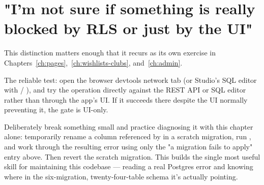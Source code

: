\section*{"I'm not sure if something is really blocked by RLS or just by the UI"}
This distinction matters enough that it recurs as its own exercise in Chapters~\ref{ch:pages},~\ref{ch:wishlists-clubs}, and~\ref{ch:admin}.

\begin{olkhowto}
The reliable test: open the browser devtools network tab (or Studio's SQL editor with  / ), and try the operation directly against the REST API or SQL editor rather than through the app's UI. If it succeeds there despite the UI normally preventing it, the gate is UI-only.
\end{olkhowto}

\begin{olktask}
Deliberately break something small and practice diagnosing it with this chapter alone: temporarily rename a column referenced by  in a scratch migration, run , and work through the resulting error using only the "a migration fails to apply" entry above. Then revert the scratch migration. This builds the single most useful skill for maintaining this codebase — reading a real Postgres error and knowing where in the six-migration, twenty-four-table schema it's actually pointing.
\end{olktask}

